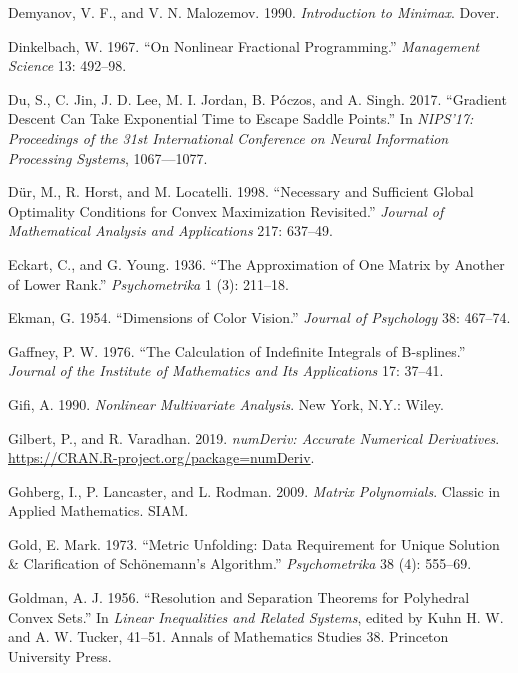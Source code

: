 \documentclass[
  12pt,
  letterpaper,
  DIV=11,
  numbers=noendperiod]{scrreprt}
\newlength{\cslhangindent}
\newenvironment{CSLReferences}[2] %
 {\begin{list}{}{%
  \setlength{\itemindent}{0pt}
  \setlength{\leftmargin}{0pt}
  \setlength{\parsep}{0pt}
  \ifodd #1
   \setlength{\leftmargin}{\cslhangindent}
   \setlength{\itemindent}{-1\cslhangindent}
  \fi
  \setlength{\itemsep}{#2\baselineskip}}}
 {\end{list}}
\theoremstyle{remark}
\begin{document}
\begin{CSLReferences}{1}{0}
Demyanov, V. F., and V. N. Malozemov. 1990. \emph{Introduction to
Minimax}. Dover.

Dinkelbach, W. 1967. {``{On Nonlinear Fractional Programming}.''}
\emph{Management Science} 13: 492--98.

Du, S., C. Jin, J. D. Lee, M. I. Jordan, B. Póczos, and A. Singh. 2017.
{``{Gradient Descent Can Take Exponential Time to Escape Saddle
Points}.''} In \emph{NIPS'17: Proceedings of the 31st International
Conference on Neural Information Processing Systems}, 1067---1077.

Dür, M., R. Horst, and M. Locatelli. 1998. {``{Necessary and Sufficient
Global Optimality Conditions for Convex Maximization Revisited}.''}
\emph{Journal of Mathematical Analysis and Applications} 217: 637--49.

Eckart, C., and G. Young. 1936. {``{The Approximation of One Matrix by
Another of Lower Rank}.''} \emph{Psychometrika} 1 (3): 211--18.

Ekman, G. 1954. {``{Dimensions of Color Vision}.''} \emph{Journal of
Psychology} 38: 467--74.

Gaffney, P. W. 1976. {``{The Calculation of Indefinite Integrals of
B-splines}.''} \emph{Journal of the Institute of Mathematics and Its
Applications} 17: 37--41.

Gifi, A. 1990. \emph{Nonlinear Multivariate Analysis}. New York, N.Y.:
Wiley.

Gilbert, P., and R. Varadhan. 2019. \emph{{numDeriv: Accurate Numerical
Derivatives}}. \url{https://CRAN.R-project.org/package=numDeriv}.

Gohberg, I., P. Lancaster, and L. Rodman. 2009. \emph{Matrix
Polynomials}. Classic in Applied Mathematics. SIAM.

Gold, E. Mark. 1973. {``{Metric Unfolding: Data Requirement for Unique
Solution \& Clarification of Sch{ö}nemann's Algorithm}.''}
\emph{Psychometrika} 38 (4): 555--69.

Goldman, A. J. 1956. {``{Resolution and Separation Theorems for
Polyhedral Convex Sets}.''} In \emph{Linear Inequalities and Related
Systems}, edited by Kuhn H. W. and A. W. Tucker, 41--51. Annals of
Mathematics Studies 38. Princeton University Press.


\end{CSLReferences}
\end{document}
